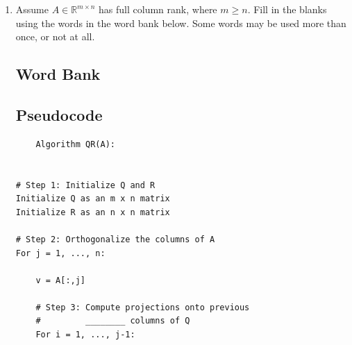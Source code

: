 \documentclass{ximera}
\begin{document}

\begin{exercise}

\begin{enumerate} \item Assume $A \in \mathbb{R}^{m\times n}$ has full column rank, where $m\geq n$. Fill in the blanks using the words in the word bank below. Some words may be used more than once, or not at all.


\subsection*{Word Bank}

\begin{center}  \end{center}

\subsection*{Pseudocode}

\begin{verbatim}
    Algorithm QR(A):


# Step 1: Initialize Q and R
Initialize Q as an m x n matrix
Initialize R as an n x n matrix

# Step 2: Orthogonalize the columns of A
For j = 1, ..., n:

    v = A[:,j]

    # Step 3: Compute projections onto previous
    #         ________ columns of Q
    For i = 1, ..., j-1:


\end{verbatim}
\end{enumerate}
\end{exercise}
\end{document}

